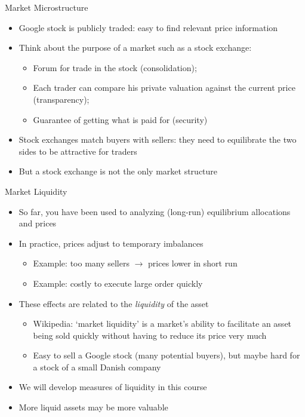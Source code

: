 \documentclass[english,10pt]{beamer}
\theoremstyle{definition}
\begin{document}
\begin{frame}{Market Microstructure}
\begin{itemize}
\item Google stock is publicly traded: easy to find relevant price information

\item Think about the purpose of a market such as a stock exchange:
\begin{itemize}
\item Forum for trade in the stock (consolidation);
\item Each trader can compare his private valuation against the current price (transparency);
\item Guarantee of getting what is paid for (security)
\end{itemize}

\item Stock exchanges match buyers with sellers: they need to equilibrate the two sides to be attractive for traders

\item But a stock exchange is not the only market structure

\end{itemize}

\end{frame}



\begin{frame}{Market Liquidity}
\begin{itemize}
\item So far, you have been used to analyzing (long-run) equilibrium allocations and prices
\item In practice, prices adjust to temporary imbalances
\begin{itemize}
\item Example: too many sellers $\rightarrow$ prices lower in short run
\item Example: costly to execute large order quickly
\end{itemize}

\item These effects are related to the \textit{liquidity} of the asset
\begin{itemize}
\item Wikipedia: `market liquidity' is a market's ability to facilitate an asset being sold quickly without having to reduce its price very much
\item Easy to sell a Google stock (many potential buyers), but maybe hard for a stock of a small Danish company
\end{itemize}
\item We will develop measures of liquidity in this course
\item More liquid assets may be more valuable
\end{itemize}

\end{frame}
\end{document}
